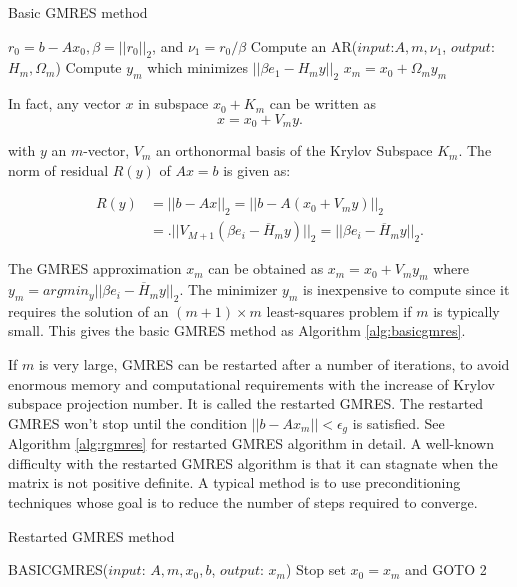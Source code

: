 \begin{algorithm}[htbp]
	\caption{Basic GMRES method}
	\label{alg:basicgmres}
	\begin{algorithmic}[1]
		\State $r_0=b-A x_0, \beta=||r_0||_2$, and $\nu_1=r_0/\beta$
		\State Compute an AR($input$:$A,m,\nu_1$, $output$: $H_m, \Omega_m$)
		\State Compute $y_m$ which minimizes $||\beta e_1-H_m y||_2$ 
		\State $x_m=x_0+\Omega_my_m$
		\EndFunction
	\end{algorithmic}
\end{algorithm}

In fact, any vector $x$ in subspace $x_0+K_m$ can be written as 
\begin{equation}
x = x_0 + V_m y.
\end{equation}

with $y$ an $m$-vector, $V_m$ an orthonormal basis of the Krylov Subspace $K_m$. The norm of residual $R(y)$ of $Ax=b$ is given as:

\begin{equation}
\begin{aligned}
R(y) & = ||b-Ax||_2 =||b-A(x_0+V_m y)||_2 \\&= .||V_{M+1}(\beta e_i - \overline{H}_m y)||_2 = ||\beta e_i - \overline{H}_m y||_2.
\end{aligned}
\end{equation}

The GMRES approximation $x_m$ can be obtained as $x_m = x_0+V_my_m$ where $y_m = argmin_y||\beta e_i - \overline{H}_m y||_2$. The minimizer $y_m$ is inexpensive to compute since it requires the solution of an $(m+1) \times m$ least-squares problem if $m$ is typically small. This gives the basic GMRES method as Algorithm \ref{alg:basicgmres}.

If $m$ is very large, GMRES can be restarted after a number of iterations, to avoid enormous memory and computational requirements with the increase of Krylov subspace projection number. It is called the restarted GMRES. The restarted GMRES won't stop until the condition $||b-Ax_m||<\epsilon_g$ is satisfied. See Algorithm \ref{alg:rgmres} for restarted GMRES algorithm in detail. A well-known difficulty with the restarted GMRES algorithm is that it can stagnate when the matrix is not positive definite. A typical method is to use preconditioning techniques whose goal is to reduce the number of steps required to converge.


\begin{algorithm}[htbp]
	\caption{Restarted GMRES method}
	\label{alg:rgmres}
	\begin{algorithmic}[1]
		\State BASICGMRES($input$: $A, m, x_0,b$, $output$: $x_m$)
		\State Stop
		\Else \State set $x_0 = x_m$ and GOTO 2
		\EndIf
		\EndFunction
	\end{algorithmic}
\end{algorithm}

